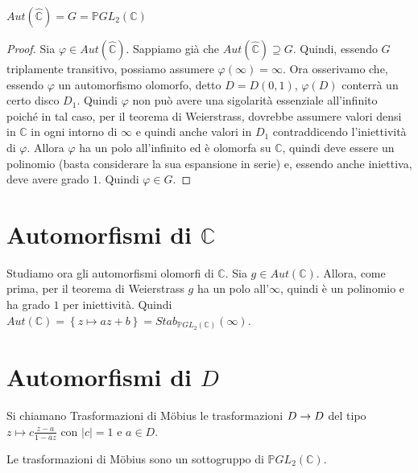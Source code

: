 \begin{proposizione}
$Aut (\hat{\mathbb{C}} ) = G = \mathbb{P}GL_2 (\mathbb{C} )$
\end{proposizione}
\begin{proof}
Sia $\varphi \in Aut (\hat{\mathbb{C}} )$. Sappiamo già che $Aut (\hat{\mathbb{C}} ) \supseteq G$.
Quindi, essendo $G$ triplamente transitivo, possiamo assumere $\varphi( \infty ) = \infty$.
Ora osserivamo che, essendo $\varphi$ un automorfismo olomorfo, detto $D=D(0,1)$, $\varphi (D)$ conterrà
un certo disco $D_1$. Quindi $\varphi$ non può avere una sigolarità essenziale all'infinito poiché in tal caso,
per il teorema di Weierstrass, dovrebbe assumere valori densi in $\mathbb{C}$ in ogni intorno di $\infty$
e quindi anche valori in $D_1$ contraddicendo l'iniettività di $\varphi$.
Allora $\varphi$ ha un polo all'infinito ed è olomorfa su $\mathbb{C}$, quindi deve essere un polinomio (basta considerare la sua espansione in serie) e,
essendo anche iniettiva, deve avere grado $1$. Quindi $\varphi \in G$.
\end{proof}


\section{Automorfismi di $\mathbb{C}$}
Studiamo ora gli automorfismi olomorfi di $\mathbb{C}$.
Sia $g \in Aut(\mathbb{C})$. Allora, come prima, per il teorema di Weierstrass $g$ ha un polo all'$\infty$,
quindi è un polinomio e ha grado $1$ per iniettività. Quindi
$Aut(\mathbb{C} )= \left\{ z\mapsto az+b \right\} = Stab_{\mathbb{P} GL_2 (\mathbb{C})} (\infty )$.


\section{Automorfismi di $D$}
\begin{definizione}
Si chiamano Trasformazioni di Möbius le trasformazioni $D \rightarrow D$ del tipo $z\mapsto c \displaystyle{\frac{z-a}{1- \bar{a}z}}$ con $|c|=1$ e $a \in D$.
\end{definizione}


\begin{esercizio}
Le trasformazioni di Möbius sono un sottogruppo di $\mathbb{P} GL_2 (\mathbb{C})$.
\end{esercizio}

